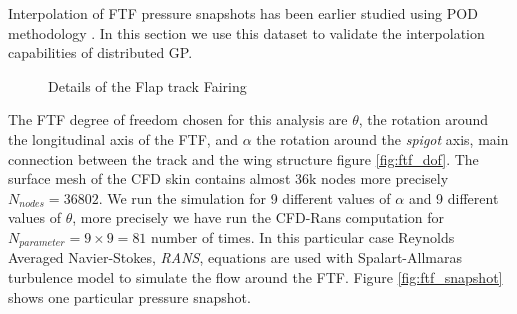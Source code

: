 Interpolation of FTF pressure snapshots has been earlier studied using POD methodology  \cite{bosco2016nonlinear}. In this section we use this dataset to validate the interpolation capabilities of distributed GP. 


\begin{figure}[!ht]
  \centering
  \quad
  \quad
      \caption{Details of the Flap track Fairing}
\end{figure}


The FTF degree of freedom chosen for this analysis are $\theta$, the rotation around the longitudinal axis of the FTF, and $\alpha$ the rotation around the {\it spigot} axis, main connection between the track and the wing structure figure \ref{fig:ftf_dof}. The surface mesh of the CFD skin contains almost 36k nodes more precisely \(N_{nodes} = 36802\). We run the simulation for 9 different values of \(\alpha\) and 9 different values of \(\theta\), more precisely we have run the CFD-Rans computation for \(N_{parameter} = 9\times9 = 81\) number of times. In this particular case Reynolds Averaged  Navier-Stokes, {\it RANS}, equations are used with Spalart-Allmaras turbulence model to simulate the flow around the FTF. Figure \ref{fig:ftf_snapshot} shows one particular pressure snapshot. 

